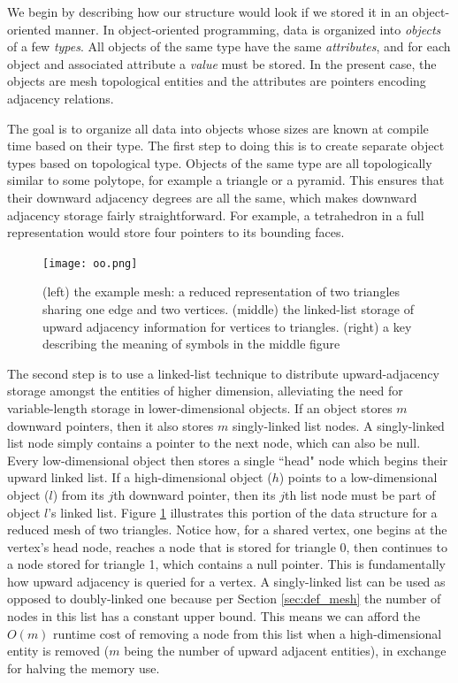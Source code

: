 We begin by describing how our structure would look
if we stored it in an object-oriented manner.
In object-oriented programming, data is organized
into {\it objects} of a few {\it types}.
All objects of the same type have the same {\it attributes},
and for each object and associated attribute a {\it value} must be stored.
In the present case, the objects are mesh topological entities
and the attributes are pointers encoding adjacency relations.

The goal is to organize all data into objects whose
sizes are known at compile time based on their type.
The first step to doing this is to create separate object types
based on topological type.
Objects of the same type are all topologically similar to some polytope,
for example a triangle or a pyramid.
This ensures that their downward adjacency degrees are all the same,
which makes downward adjacency storage fairly straightforward.
For example, a tetrahedron in a full representation would store
four pointers to its bounding faces.

\begin{figure}
\begin{center}
\texttt{[image: oo.png]}
\caption{(left) the example mesh: a reduced representation of two
triangles sharing one edge and two vertices.
(middle) the linked-list storage of upward adjacency information
for vertices to triangles.
(right) a key describing the meaning of symbols in the middle figure}
\label{fig:oo}
\end{center}
\end{figure}

The second step is to use a linked-list technique \cite{karamete2016novel}
to distribute upward-adjacency storage amongst the entities
of higher dimension, alleviating the need for variable-length
storage in lower-dimensional objects.
If an object stores $m$ downward pointers, then it also stores
$m$ singly-linked list nodes.
A singly-linked list node simply contains a pointer to the next
node, which can also be null.
Every low-dimensional object then stores a single ``head" node
which begins their upward linked list.
If a high-dimensional object ($h$) points to a low-dimensional object ($l$)
from its $j$th downward pointer, then its $j$th list node must be
part of object $l$'s linked list.
Figure \ref{fig:oo} illustrates this portion of the data structure
for a reduced mesh of two triangles.
Notice how, for a shared vertex, one begins at the vertex's head node,
reaches a node that is stored for triangle 0, then continues
to a node stored for triangle 1, which contains a null pointer.
This is fundamentally how upward adjacency is queried for a vertex.
A singly-linked list can be used as opposed to doubly-linked one
because per Section \ref{sec:def_mesh}
the number of nodes in this list has a constant upper bound.
This means we can afford the $O(m)$ runtime cost of removing a node from this
list when a high-dimensional entity is removed
($m$ being the number of upward adjacent entities),
in exchange for halving the memory use.

